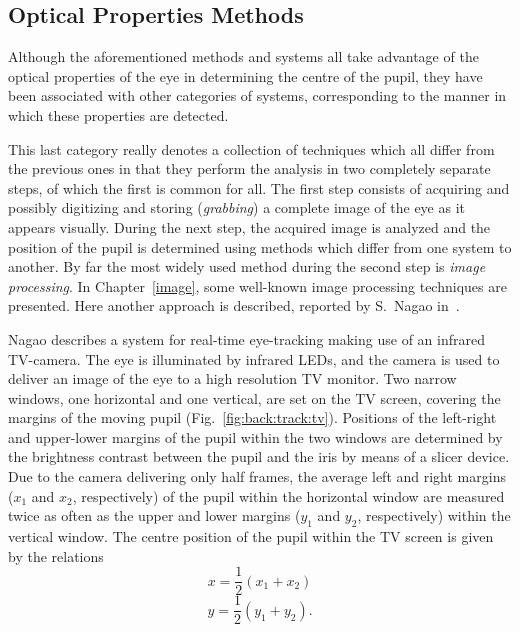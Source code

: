 \subsection{Optical Properties Methods}
\label{back:track:tv}

Although the aforementioned methods and systems all take advantage of
the optical properties of the eye in determining the centre of the
pupil, they have been associated with other categories of systems,
corresponding to the manner in which these properties are detected.

This last category really denotes a collection of techniques which all
differ from the previous ones in that they perform the analysis in two
completely separate steps, of which the first is common for all.  The
first step consists of acquiring and possibly digitizing and storing
({\em grabbing\/}) a complete image of the eye as it appears visually.
During the next step, the acquired image is analyzed and the position
of the pupil is determined using methods which differ from one system
to another.  By far the most widely used method during the second step
is {\em image processing\/}.  In Chapter~\ref{image}, some well-known
image processing techniques are presented.  Here another approach is
described, reported by S.\ Nagao in~\cite{tv}.

Nagao describes a system for real-time eye-tracking making use of an
infrared TV-camera.  The eye is illuminated by infrared LEDs, and the
camera is used to deliver an image of the eye to a high resolution TV
monitor.  Two narrow windows, one horizontal and one vertical, are set
on the TV screen, covering the margins of the moving pupil
(Fig.~\ref{fig:back:track:tv}).  Positions of the left-right and
upper-lower margins of the pupil within the two windows are determined
by the brightness contrast between the pupil and the iris by means of
a slicer device.  Due to the camera delivering only half frames, the
average left and right margins ($x_{1}$ and $x_{2}$, respectively) of
the pupil within the horizontal window are measured twice as often as
the upper and lower margins ($y_{1}$ and $y_{2}$, respectively) within
the vertical window.  The centre position of the pupil within the TV
screen is given by the relations
\[x=\frac{1}{2}(x_{1}+x_{2})\] \[y=\frac{1}{2}(y_{1}+y_{2})\mbox{.}\]


